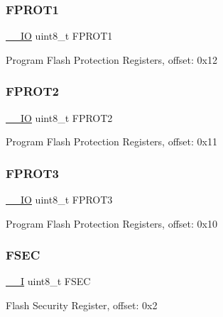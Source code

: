 \subsubsection{\texorpdfstring{FPROT1}{FPROT1}}
{\footnotesize\ttfamily \mbox{\hyperlink{core__cm0plus_8h_aec43007d9998a0a0e01faede4133d6be}{\+\_\+\+\_\+\+IO}} uint8\+\_\+t F\+P\+R\+O\+T1}

Program Flash Protection Registers, offset\+: 0x12 \mbox{\label{struct_f_t_f_a___type_a9c86520f3dd610ad464ad0a595a761a9}} 
\subsubsection{\texorpdfstring{FPROT2}{FPROT2}}
{\footnotesize\ttfamily \mbox{\hyperlink{core__cm0plus_8h_aec43007d9998a0a0e01faede4133d6be}{\+\_\+\+\_\+\+IO}} uint8\+\_\+t F\+P\+R\+O\+T2}

Program Flash Protection Registers, offset\+: 0x11 \mbox{\label{struct_f_t_f_a___type_acb3c733a52a45ab759f6a6d76d59b86c}} 
\subsubsection{\texorpdfstring{FPROT3}{FPROT3}}
{\footnotesize\ttfamily \mbox{\hyperlink{core__cm0plus_8h_aec43007d9998a0a0e01faede4133d6be}{\+\_\+\+\_\+\+IO}} uint8\+\_\+t F\+P\+R\+O\+T3}

Program Flash Protection Registers, offset\+: 0x10 \mbox{\label{struct_f_t_f_a___type_a9c289cf99054de8442c0847062613f18}} 
\subsubsection{\texorpdfstring{FSEC}{FSEC}}
{\footnotesize\ttfamily \mbox{\hyperlink{core__cm0plus_8h_af63697ed9952cc71e1225efe205f6cd3}{\+\_\+\+\_\+I}} uint8\+\_\+t F\+S\+EC}

Flash Security Register, offset\+: 0x2 \mbox{\label{struct_f_t_f_a___type_aef000e29f3b219eb64c053000c22fe97}} 
